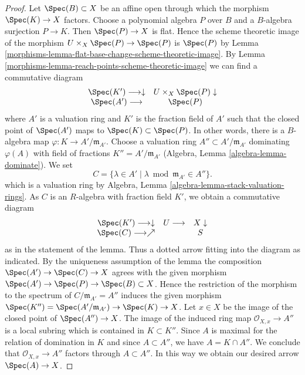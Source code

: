 \begin{proof}
\medskip\noindent
Let $\Spec(B) \subset X$ be an affine open through which
the morphism $\Spec(K) \to X$ factors. Choose a polynomial
algebra $P$ over $B$ and a $B$-algebra surjection $P \to K$.
Then $\Spec(P) \to X$ is flat. Hence the scheme theoretic image
of the morphism $U \times_X \Spec(P) \to \Spec(P)$ is $\Spec(P)$ by
Lemma \ref{morphisms-lemma-flat-base-change-scheme-theoretic-image}.
By Lemma \ref{morphisms-lemma-reach-points-scheme-theoretic-image}
we can find a commutative diagram
$$
\begin{array}{cc}\Spec(K') \longrightarrow\downarrow & U \times_X \Spec(P) \downarrow \\ \Spec(A') \longrightarrow & \Spec(P)\end{array}
$$
where $A'$ is a valuation ring and $K'$ is the fraction field of $A'$
such that the closed point of $\Spec(A')$ maps to $\Spec(K) \subset \Spec(P)$.
In other words, there is a $B$-algebra map
$\varphi : K \to A'/\mathfrak m_{A'}$. Choose a valuation ring
$A'' \subset A'/\mathfrak m_{A'}$ dominating $\varphi(A)$ with
field of fractions $K'' = A'/\mathfrak m_{A'}$
(Algebra, Lemma \ref{algebra-lemma-dominate}). We set
$$
C = \{\lambda \in A' \mid \lambda \bmod \mathfrak m_{A'} \in A''\}.
$$
which is a valuation ring by
Algebra, Lemma \ref{algebra-lemma-stack-valuation-rings}.
As $C$ is an $R$-algebra with fraction field $K'$, we obtain a
commutative diagram
$$
\begin{array}{ccc}\Spec(K') \longrightarrow\downarrow & U \longrightarrow & X \downarrow \\ \Spec(C) \longrightarrow\nearrow &  & S\end{array}
$$
as in the statement of the lemma. Thus a dotted arrow fitting into
the diagram as indicated. By the uniqueness assumption of the lemma
the composition $\Spec(A') \to \Spec(C) \to X$ agrees with the
given morphism $\Spec(A') \to \Spec(P) \to \Spec(B) \subset X$.
Hence the restriction of the morphism to the spectrum of
$C/\mathfrak m_{A'} = A''$ induces the given morphism
$\Spec(K'') = \Spec(A'/\mathfrak m_{A'}) \to \Spec(K) \to X$.
Let $x \in X$ be the image of the closed point of $\Spec(A'') \to X$.
The image of the induced ring map $\mathcal{O}_{X, x} \to A''$
is a local subring which is contained in $K \subset K''$.
Since $A$ is maximal for the relation of domination in $K$
and since $A \subset A''$, we have $A = K \cap A''$. We conclude
that $\mathcal{O}_{X, x} \to A''$ factors through $A \subset A''$.
In this way we obtain our desired arrow $\Spec(A) \to X$.


\end{proof}
